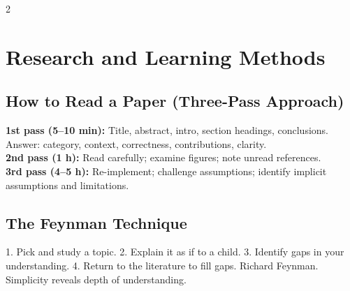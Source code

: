 \documentclass[10pt,a4paper]{article}
\begin{document}
\begin{multicols}{2}
\section{Research and Learning Methods}

\subsection{How to Read a Paper (Three-Pass Approach)}
\textbf{1st pass (5--10 min):} Title, abstract, intro, section headings, conclusions. Answer: category, context, correctness, contributions, clarity.\\
\textbf{2nd pass (1 h):} Read carefully; examine figures; note unread references.\\
\textbf{3rd pass (4--5 h):} Re-implement; challenge assumptions; identify implicit assumptions and limitations.

\subsection{The Feynman Technique}
1. Pick and study a topic. 2. Explain it as if to a child. 3. Identify gaps in your understanding. 4. Return to the literature to fill gaps. Richard Feynman. Simplicity reveals depth of understanding.

\end{multicols}
\end{document}
